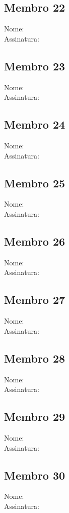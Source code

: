 \documentclass[12pt]{article}
\begin{document}
\newpage
\subsection{Membro 22}
Nome: \\
Assinatura: \underline{\hspace{5cm}}

\newpage
\subsection{Membro 23}
Nome: \\
Assinatura: \underline{\hspace{5cm}}

\newpage
\subsection{Membro 24}
Nome: \\
Assinatura: \underline{\hspace{5cm}}

\newpage
\subsection{Membro 25}
Nome: \\
Assinatura: \underline{\hspace{5cm}}

\newpage
\subsection{Membro 26}
Nome: \\
Assinatura: \underline{\hspace{5cm}}

\newpage
\subsection{Membro 27}
Nome: \\
Assinatura: \underline{\hspace{5cm}}

\newpage
\subsection{Membro 28}
Nome: \\
Assinatura: \underline{\hspace{5cm}}

\newpage
\subsection{Membro 29}
Nome: \\
Assinatura: \underline{\hspace{5cm}}

\newpage
\subsection{Membro 30}
Nome: \\
Assinatura: \underline{\hspace{5cm}}
\end{document}
